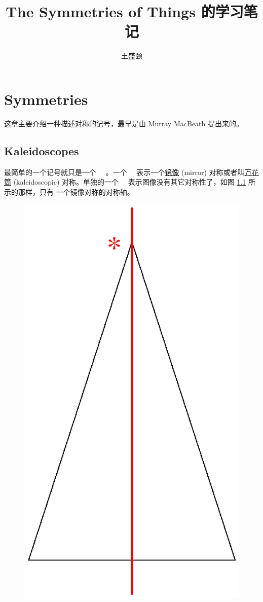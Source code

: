 \documentclass[cs4size,a4paper,adobefonts,openany]{ctexbook}
\newcommand{\pname}[1]{\underline{#1}}
\numberwithin{equation}{section}
\newcommand{\starSym}{\ {\color{red}{$\ast$}}\ }
\begin{document}
\title{\bfseries The Symmetries of Things 的学习笔记}
\author{王盛颐}
\date{}
\maketitle
\setcounter{page}{1}
\chapter{Symmetries}

这章主要介绍一种描述对称的记号，最早是由 Murray MacBeath 提出来的。

\section{Kaleidoscopes}
最简单的一个记号就只是一个 \starSym。一个 \starSym 表示一个\pname{镜像}
(mirror) 对称或者叫\pname{万花筒} (kaleidoscopic) 对称。单独的一个
\starSym 表示图像没有其它对称性了，如图 \ref{pic:star} 所示的那样，只有
一个镜像对称的对称轴。
\begin{figure}[htbp]
\label{pic:star}
\includegraphics[width=.2\textwidth]{images/star}
\end{figure}
\end{document}
